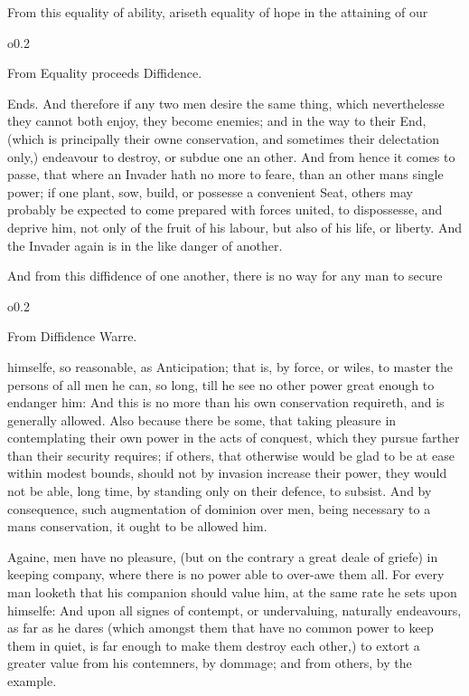 From this equality of ability, ariseth equality of hope in the
attaining of our \begin{wrapfigure}[5]{o}{0.2\textwidth}\raggedright
From Equality proceeds Diffidence. \end{wrapfigure} Ends. And
therefore if any two men desire the same thing, which neverthelesse
they cannot both enjoy, they become enemies; and in the way to their
End, (which is principally their owne conservation, and sometimes
their delectation only,) endeavour to destroy, or subdue one an other.
And from hence it comes to passe, that where an Invader hath no more
to feare, than an other mans single power; if one plant, sow, build,
or possesse a convenient Seat, others may probably be expected to come
prepared with forces united, to dispossesse, and deprive him, not only
of the fruit of his labour, but also of his life, or liberty. And the
Invader again is in the like danger of another.

And from this diffidence of one another, there is no way for any man
to secure \begin{wrapfigure}[4]{o}{0.2\textwidth}\raggedright From
Diffidence Warre. \end{wrapfigure} himselfe, so reasonable, as
Anticipation; that is, by force, or wiles, to master the persons of
all men he can, so long, till he see  no other power great
enough to endanger him: And this is no more than his own conservation
requireth, and is generally allowed. Also because there be some, that
taking pleasure in contemplating their own power in the acts of
conquest, which they pursue farther than their security requires; if
others, that otherwise would be glad to be at ease within modest
bounds, should not by invasion increase their power, they would not be
able, long time, by standing only on their defence, to subsist. And by
consequence, such augmentation of dominion over men, being necessary
to a mans conservation, it ought to be allowed him.

Againe, men have no pleasure, (but on the contrary a great deale of
griefe) in keeping company, where there is no power able to over-awe
them all. For every man looketh that his companion should value him,
at the same rate he sets upon himselfe: And upon all signes of
contempt, or undervaluing, naturally endeavours, as far as he dares
(which amongst them that have no common power to keep them in quiet,
is far enough to make them destroy each other,) to extort a greater
value from his contemners, by dommage; and from others, by the
example.


